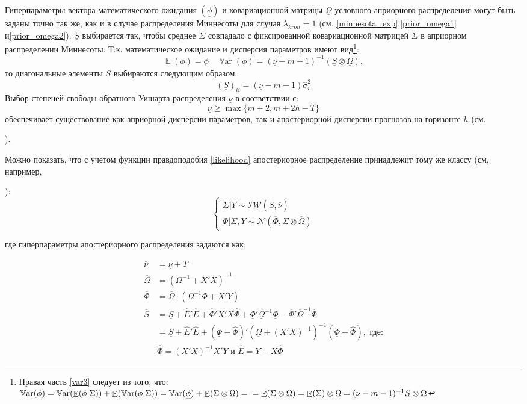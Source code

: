 \documentclass[11pt]{article} %
\DeclareMathOperator{\E}{\mathbb{E}}
\DeclareMathOperator{\Var}{\mathbb{V}\mathrm{ar}}
\newcommand{\cN}{\mathcal{N}}
\newcommand{\cIW}{\mathcal{IW}}
\newcommand{\prior}{\underline}
\newcommand{\post}{\overline}
\newcommand{\eng}[1]{\begin{otherlanguage}{english}#1\end{otherlanguage}}
\begin{document}
Гиперпараметры вектора математического ожидания $(\prior \phi)$ и ковариационной матрицы $\prior \Omega$ условного априорного распределения  могут быть заданы точно так же, как и в случае распределения Миннесоты для  случая $\lambda_{kron} =1$ (см. \eqref{minnesota_exp},\eqref{prior_omega1} и\eqref{prior_omega2}).
$\prior S$ выбирается так, чтобы среднее $\Sigma$ совпадало с фиксированной ковариационной матрицей $\Sigma$ в априорном распределении Миннесоты. Т.к. математическое ожидание и дисперсия параметров имеют вид\footnote{Правая часть \ref{var3} следует из того, что:
$\Var(\phi)=\Var(\E(\phi|\Sigma))+\E(\Var(\phi|\Sigma))=\Var(\prior\phi)+\E(\Sigma\otimes\prior\Omega)=\\=\E(\Sigma\otimes\prior\Omega)=\E(\Sigma)\otimes\prior\Omega=(\nu-m-1)^{-1}\prior S\otimes \prior\Omega$
}:
\begin{equation}
\E(\phi)=\prior \phi \quad \Var(\phi)=(\prior \nu - m -1)^{-1}(\prior S\otimes \prior \Omega),\label{var3}
\end{equation}
то диагональные элементы $\prior S$ выбираются следующим образом:
\begin{equation}
(\prior S)_{ii}= (\prior \nu- m- 1) \hat\sigma^2_{i}
\end{equation}
Выбор степеней свободы обратного Уишарта распределения $\prior\nu$ в соответствии с:
\begin{equation}
\prior \nu \geq\max\lbrace m+2, m+2h-T\rbrace
\end{equation}
обеспечивает существование как априорной дисперсии параметров, так и апостериорной дисперсии прогнозов на горизонте $h$ (см. \eng{\cite{kadiyala_karlsson_1997}}).

Можно показать, что с учетом функции правдоподобия \eqref{likelihood} апостериорное распределение принадлежит тому же классу (см, например, \eng{\cite{zellner_1996}}):
\begin{equation}
\begin{cases}
\Sigma|Y \sim \cIW(\post S, \post \nu) \\
\Phi|\Sigma,Y\sim \cN (\post \Phi, \Sigma\otimes\post \Omega)
\end{cases}
\end{equation}

где гиперпараметры апостериорного распределения задаются как:

\begin{align*}
\post\nu &=\prior \nu+T\\
\post{\Omega}&=(\prior \Omega^{-1}+X'X)^{-1}\\
\post \Phi&=\post{\Omega}\cdot (\prior \Omega^{-1}\prior \Phi+X'Y)\\
\post S&=\prior S +\hat E'\hat E+\hat \Phi'
 X'X \hat \Phi +\prior \Phi'\prior\Omega^{-1}\prior \Phi-\post \Phi'\post\Omega^{-1}\post \Phi\\&=\prior S +\hat E'\hat E + (\prior \Phi - \hat \Phi)'(\prior \Omega + (X'X)^{-1})^{-1}(\prior \Phi - \hat \Phi), \text{ где:} \\
&\hat\Phi=(X'X)^{-1}X'Y \text{ и } \hat E=Y-X\hat\Phi
\end{align*}
\end{document}
